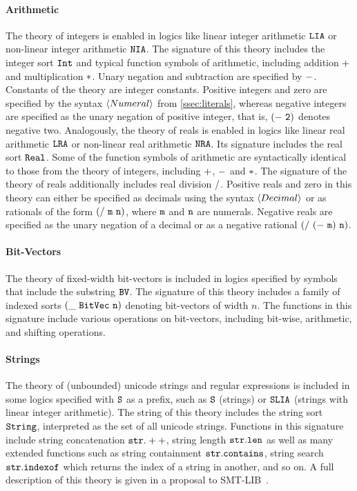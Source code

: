 \documentclass[english,a4paper,10pt]{article}
\begin{document}
\paragraph{Arithmetic}
The theory of integers is enabled 
in logics like linear integer arithmetic ${\tt LIA}$
or non-linear integer arithmetic ${\tt NIA}$.
The signature of this theory includes the integer sort ${\tt Int}$ and
typical function symbols of arithmetic, including
addition ${\tt +}$
and multiplication ${\tt *}$.
Unary negation and subtraction are specified by ${\tt -}$.
Constants of the theory are integer constants.
Positive integers and zero are specified by the syntax $\left\langle Numeral\right\rangle$ from \cref{ssec:literals},
whereas negative integers are specified as the unary negation of positive integer,
that is, ${\tt (-\ 2)}$ denotes negative two.
Analogously, 
the theory of reals is enabled
in logics like linear real arithmetic ${\tt LRA}$
or non-linear real arithmetic ${\tt NRA}$.
Its signature includes the real sort ${\tt Real}$.
Some of the function symbols of arithmetic are syntactically identical to
those from the theory of integers, including
${\tt +}$, ${\tt -}$ and ${\tt *}$.
The signature of the theory of reals additionally includes
real division ${\tt /}$.
Positive reals and zero in this theory can either be specified as
decimals using the syntax $\left\langle Decimal\right\rangle$
or as rationals of the form ${\tt (/\ m\ n)}$,
where ${\tt m}$ and ${\tt n}$ are numerals.
Negative reals are specified as the unary negation of a decimal
or as a negative rational ${\tt (/\ (-\ m)\ n)}$.

\paragraph{Bit-Vectors}
The theory of fixed-width bit-vectors
is included in logics specified 
by symbols that include the substring ${\tt BV}$.
The signature of this theory includes a family of 
indexed sorts ${\tt (\_\ BitVec\ n)}$
denoting bit-vectors of width $n$.
The functions in this signature include various operations on bit-vectors,
including bit-wise, arithmetic, and shifting operations.

\paragraph{Strings}
The theory of (unbounded) unicode strings and regular expressions
is included in some logics specified with ${\tt S}$ as a prefix,
such as ${\tt S}$ (strings) or ${\tt SLIA}$ (strings
with linear integer arithmetic).
The string of this theory includes the string sort ${\tt String}$,
interpreted as the set of all unicode strings.
Functions in this signature include string concatenation ${\tt str.++}$,
string length ${\tt str.len}$ as well as many extended functions
such as string containment ${\tt str.contains}$,
string search ${\tt str.indexof}$ which returns the index of
a string in another, and so on.
A full description of this theory is given in a proposal to SMT-LIB~\cite{smtlibStrings}.
\end{document}
